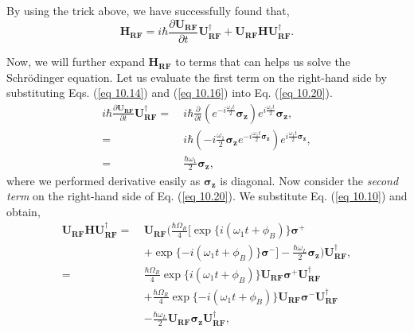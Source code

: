 \documentclass{article}
\begin{document}
By using the trick above, we have successfully found that,
\begin{equation}\label{eq 10.20}
    \boldsymbol{H_{RF}}=i\hbar\frac{\partial \boldsymbol{U_{RF}}}{\partial t}\boldsymbol{U}^\dagger_{\boldsymbol{RF}}+\boldsymbol{U_{RF}H}\boldsymbol{U}^\dagger_{\boldsymbol{RF}}.\tag{10.20}
\end{equation}

Now, we will further expand $\boldsymbol{H_{RF}}$ to terms that can helps us solve the Schr\"{o}dinger equation.
Let us evaluate the first term on the right-hand side by substituting Eqs. (\ref{eq 10.14}) and (\ref{eq 10.16})
into Eq. (\ref{eq 10.20}).
\begin{align*}\label{eq 10.21}
    i\hbar\frac{\partial \boldsymbol{U_{RF}}}{\partial t}\boldsymbol{U}^\dagger_{\boldsymbol{RF}}=\ &i\hbar\frac{\partial}{\partial t}\left(e^{-i\frac{\omega_1t}{2}}\boldsymbol{\sigma_z}\right)e^{i\frac{\omega_1t}{2}}\boldsymbol{\sigma_z},\\
    =\ &i\hbar\left(-i\frac{\omega_1}{2}\boldsymbol{\sigma_z}e^{-i\frac{\omega_1t}{2}\boldsymbol{\sigma_z}}\right)e^{i\frac{\omega_1t}{2}\boldsymbol{\sigma_z}},\\
    =\ &\frac{\hbar\omega_1}{2}\boldsymbol{\sigma_z},\tag{10.21}
\end{align*}
where we performed derivative easily as $\boldsymbol{\sigma_z}$ is diagonal. Now consider the 
\textit{second term} on the right-hand side of Eq. (\ref{eq 10.20}). We substitute Eq. (\ref{eq 10.10})
and obtain,
\begin{align*}\label{eq 10.22}
    \boldsymbol{U_{RF}H}\boldsymbol{U}^\dagger_{\boldsymbol{RF}} =\ &\boldsymbol{U_{RF}}\bigg( \frac{\hbar\varOmega_R}{4}[\exp \{ i(\omega_1t+\phi_B) \} \boldsymbol{\sigma^+}\\
    &+\exp \{ -i(\omega_1t+\phi_B) \} \boldsymbol{\sigma^-}]-\frac{\hbar\omega_L}{2}\boldsymbol{\sigma_z}\bigg)\boldsymbol{U}^\dagger_{\boldsymbol{RF}},\\
    =\ &\frac{\hbar\varOmega_R}{4}\exp \{ i(\omega_1t+\phi_B) \} \boldsymbol{U_{RF}\sigma^+}\boldsymbol{U}^\dagger_{\boldsymbol{RF}}\\
    &+\frac{\hbar\varOmega_R}{4}\exp \{ -i(\omega_1t+\phi_B) \} \boldsymbol{U_{RF}\sigma^-}\boldsymbol{U}^\dagger_{\boldsymbol{RF}}\\
    &-\frac{\hbar\omega_L}{2}\boldsymbol{U_{RF}\sigma_z}\boldsymbol{U}^\dagger_{\boldsymbol{RF}},\tag{10.22}
\end{align*}
\end{document}
